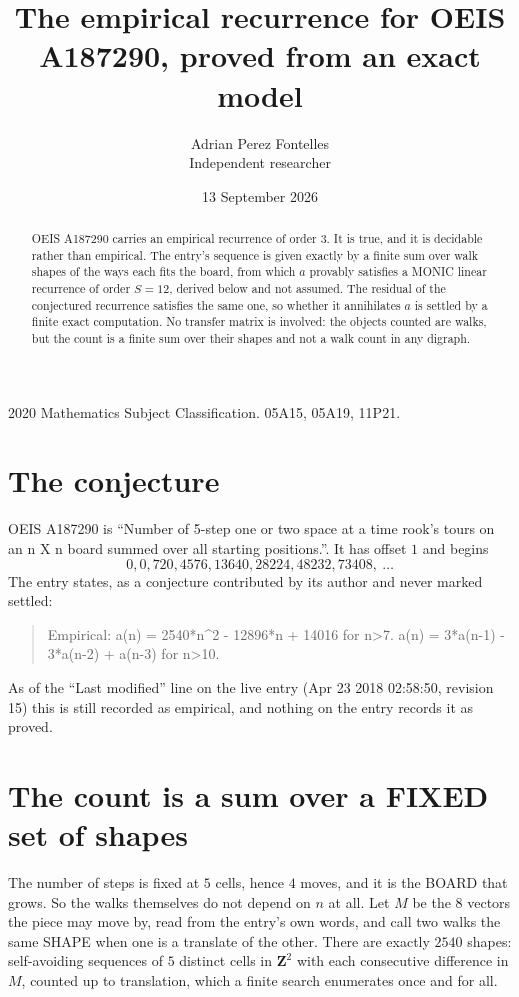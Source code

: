 \documentclass[11pt,a4paper]{article}
\title{The empirical recurrence for OEIS A187290, proved from an exact model}
\author{Adrian Perez Fontelles\\ \small Independent researcher}
\date{13 September 2026}
\theoremstyle{plain}
\theoremstyle{definition}
\begin{document}
\maketitle

\begin{abstract}
OEIS A187290 carries an empirical recurrence of order $3$. It is true, and it is
decidable rather than empirical. The entry's sequence is given exactly by a finite sum over walk shapes of the ways each fits the board, from
which $a$ provably satisfies a MONIC linear recurrence of order $S=12$, derived below and not
assumed. The residual of the conjectured recurrence satisfies the same one, so whether it
annihilates $a$ is settled by a finite exact computation. No transfer matrix is involved: the objects counted are walks, but the count is a finite sum over their shapes and not a walk count in any digraph.
\end{abstract}

\noindent\small 2020 Mathematics Subject Classification. 05A15, 05A19, 11P21.\normalsize

\section{The conjecture}

OEIS A187290 is ``Number of 5-step one or two space at a time rook's tours on an n X n board summed over all starting positions.''. It has offset $1$ and begins
\[
0, 0, 720, 4576, 13640, 28224, 48232, 73408,\ \dots
\]
The entry states, as a conjecture contributed by its author and never marked settled:
\begin{quote}
Empirical: a(n) = 2540*n\^{}2 - 12896*n + 14016 for n>7. a(n) = 3*a(n-1) - 3*a(n-2) + a(n-3) for n>10.
\end{quote}
As of the ``Last modified'' line on the live entry (Apr 23 2018 02:58:50, revision 15)
this is still recorded as empirical, and nothing on the entry records it as proved.

\section{The count is a sum over a FIXED set of shapes}

The number of steps is fixed at $5$ cells, hence $4$ moves, and it is the BOARD
that grows. So the walks themselves do not depend on $n$ at all. Let $M$ be the $8$
vectors the piece may move by, read from the entry's own words, and call two walks the same
SHAPE when one is a translate of the other. There are exactly $2540$ shapes: self-avoiding
sequences of $5$ distinct cells in $\mathbf{Z}^{2}$ with each consecutive difference in
$M$, counted up to translation, which a finite search enumerates once and for all.
\end{document}
